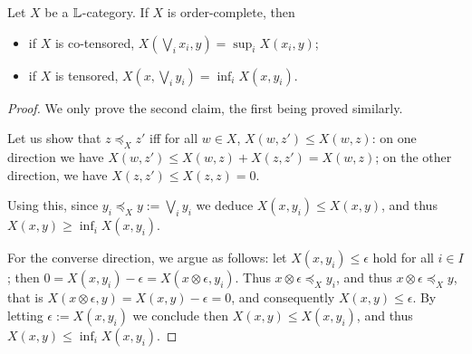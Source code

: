 \begin{lemma}\label{lemma:supinf}
Let $X$ be a $\mathbb{L}$-category. If $X$ is order-complete, then 
\begin{itemize}
\item if $X$ is co-tensored, $X(\bigvee_{i}x_{i},y)=  \sup_{i}X(x_{i},y) $;
\item if $X$ is tensored, $
X(x,\bigvee_{i}y_{i})=  \inf_{i}X(x,y_{i})$.

\end{itemize}
\end{lemma}
\begin{proof}
We only prove the second claim, the first being proved similarly.

 Let us show that $z\preceq_{X}z'$ iff for all $w\in X$, $X(w,z')\leq X(w,z)$: 
 on one direction we have $X(w,z')\leq X(w,z)+X(z,z')=X(w,z)$; on the other direction, 
 we have $X(z,z')\leq X(z,z)=0$. 
 
 Using this, since $y_{i}\preceq_{X}y:=\bigvee_{i}y_{i}$ we deduce 
 $X(x,y_{i})\leq X(x,y)$, and thus $X(x,y)\geq \inf_{i}X(x,y_{i})$. 
 
 
 For the converse direction, we argue as follows: let $X(x,y_{i})\leq \epsilon$ hold for all $i\in I$; then $0=X(x,y_{i})-\epsilon= X(x\otimes\epsilon,y_{i})$. Thus $x\otimes\epsilon\preceq_{X}y_{i}$, and thus
 $x\otimes\epsilon\preceq_{X}y$, that is $X(x\otimes\epsilon,y)=X(x,y)-\epsilon=0$, and consequently $X(x,y)\leq \epsilon$. 
 By letting $\epsilon:=X(x,y_{i})$ we conclude then $X(x,y)\leq X(x,y_{i})$, and thus $X(x,y)\leq \inf_{i}X(x,y_{i})$.
 
  
%
% 
%
% 
% 
% 
% 
 


\end{proof}

